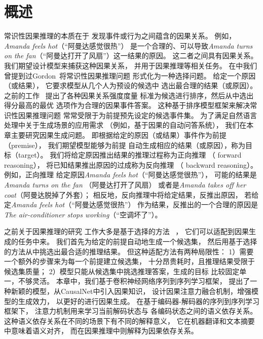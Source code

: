 \section{概述}
\label{sec:causalgen-intro}
常识性因果推理的本质在于
发现事件或行为之间蕴含的因果关系。
例如，
\emph{Amanda feels hot}（“阿曼达感觉很热”）
是一个合理的、可以导致\emph{Amanda turns on the fan}（“阿曼达打开了风扇”）这一结果的原因。
这二者之间具有因果关系。
我们期望设计模型来捕获这种因果关系，
并用于因果推理等相关任务。
在中我们
曾提到过Gordon~\cite{roemmele2011choice}将常识性因果推理问题
形式化为一种选择问题。
给定一个原因（或结果），
它要求模型从几个人为预设的候选中
选出最合理的结果（或原因）。
之前的工作~\cite{roemmele2011choice,LuoSZHW16}
提出了各种因果关系强度度量
标准为候选进行排序，然后从中选出得分最高的最优
选项作为合理的因果事件答案。
这种基于排序模型框架来解决常识性因果推理问题
常常受限于为前提预先设定的候选事件集。
为了满足自然语言处理中关于生成场景的应用需求
（例如，基于因果的自动问答系统），
我们在本章主要研究因果生成问题。
即根据给定的原因（或结果）事件作为前提（premise），
我们期望模型能够为前提
自动生成相应的结果（或原因），称为目标（target）。
我们将给定原因推出结果的推理过程称为正向推理
（ forward reasoning），
将已知结果推出原因的过成称为反向推理
（ backward reasoning）。
例如，正向推理
给定原因\emph{Amanda feels hot}（“阿曼达感觉很热”），
可能的结果是\emph{Amanda turns on the fan}
（阿曼达打开了风扇）
或者是\emph{Amanda takes off
her coat}（阿曼达脱掉了外套）；
相反地，反向推理中将给定结果，反推出原因，
若给定\emph{Amanda feels hot}（“阿曼达感觉很热”）
作为结果，反推出的一个合理的原因是
\emph{The air-conditioner stops working}（“空调坏了”）。

之前关于因果推理的研究
工作大多是基于选择的方法
~\cite{roemmele2011choice,goodwin2012utdhlt,jabeen2014using, LuoSZHW16}，
它们可以适配到因果生成的任务中来。
我们首先为给定的前提自动地生成一个候选集，
然后用基于选择的方法从中挑选出最合适的推理结果。
但这种适配方法有两种局限性：
1）需要一个额外的步骤来为每一个前提建立候选集，
十分昂贵耗时，且推理结果受限于候选集质量；
2）模型只能从候选集中挑选推理答案，生成的目标
比较固定单一，不够灵活。
本章中，我们基于卷积神经网络序列到序列学习框架，
提出了一种新颖的模型，从CausalNet中引入因果知识，
设计因果注意力融合机制，增强模型的生成效力，
以更好的进行因果生成。
在基于编码器-解码器的序列到序列学习框架下，
注意力机制用来学习当前解码状态与
各编码状态之间的语义依存关系。
这种语义依存关系在不同的场景下有不同的解释意义，
它在机器翻译和文本摘要中意味着语义对齐，
而在因果推理中则解释为因果依存关系。

